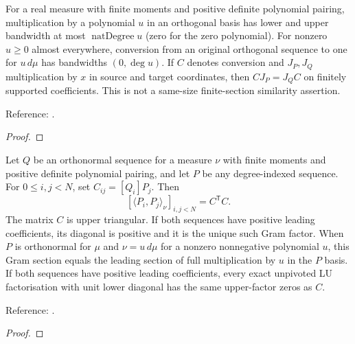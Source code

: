 \begin{theorem}
\label{thm:univariate-modification-operators}
\leanok
For a real measure with finite moments and positive definite polynomial pairing,
multiplication by a polynomial $u$ in an orthogonal basis has lower and upper
bandwidth at most $\operatorname{natDegree}u$ (zero for the zero polynomial).
For nonzero $u\ge0$ almost everywhere, conversion
from an original orthogonal sequence to one for $u\,d\mu$ has bandwidths
$(0,\deg u)$. If $C$ denotes conversion and $J_P,J_Q$ multiplication by $x$
in source and target coordinates, then $CJ_P=J_QC$ on finitely supported
coefficients. This is not a same-size finite-section similarity assertion.

Reference: \cite[Section 2]{gutleb-olver-slevinsky}.
\end{theorem}
\begin{proof}
\leanok
\end{proof}

\begin{theorem}
\label{thm:univariate-connection-gram}
\leanok
Let $Q$ be an orthonormal sequence for a measure $\nu$ with finite moments and
positive definite polynomial pairing, and let $P$ be any degree-indexed sequence.
For $0\le i,j<N$, set $C_{ij}=[Q_i]P_j$. Then
\[
 [\langle P_i,P_j\rangle_\nu]_{i,j<N}=C^{\mathsf T}C.
\]
The matrix $C$ is upper triangular. If both sequences have positive leading
coefficients, its diagonal is positive and it is the unique such Gram factor.
When $P$ is orthonormal for $\mu$ and $\nu=u\,d\mu$ for a nonzero nonnegative
polynomial $u$, this Gram section equals the leading section of full
multiplication by $u$ in the $P$ basis. If both sequences have positive leading
coefficients, every exact unpivoted LU factorisation with unit lower diagonal
has the same upper-factor zeros as $C$.

Reference: \cite[Lemma 2.8]{gutleb-olver-slevinsky}.
\end{theorem}
\begin{proof}
\leanok
\end{proof}

